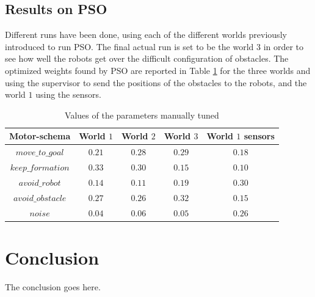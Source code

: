 \documentclass[journal]{IEEEtran}
\begin{document}
\subsection{Results on PSO}
Different runs have been done, using each of the different worlds previously introduced to run PSO. The final actual run is set to be the world $3$ in order to see how well the robots get over the difficult configuration of obstacles. The optimized weights found by PSO are reported in Table \ref{weights} for the three worlds and using the supervisor to send the positions of the obstacles to the robots, and the world $1$ using the sensors. 
\begin{table}
\begin{center}
\begin{tabular}{|c|c|c|c|c|}
  \hline
  Motor-schema & World $1$ & World $2$ & World $3$ & World $1$ sensors \\
  \hline
  $move\_to\_goal$ &  $0.21$ & $0.28$ & $0.29$ & $0.18$\\
  $keep\_formation$ & $0.33$ & $0.30$ & $0.15$ & $0.10$\\
  $avoid\_robot$ & $0.14$ & $0.11$ & $0.19$ & $0.30$\\
  $avoid\_obstacle$ & $0.27$ & $0.26$ & $0.32$ & $0.15$\\
  $noise$ & $0.04$ & $0.06$ & $0.05$ & $0.26$\\
  \hline
\end{tabular}
\caption{Values of the parameters manually tuned} \label{weights}
\end{center} 
\end{table}


\section{Conclusion}
\label{sec:5}
The conclusion goes here.





\end{document}
